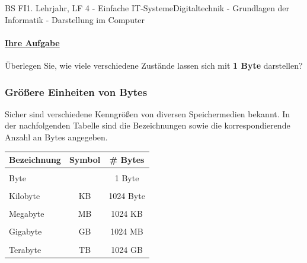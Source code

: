 \documentclass[11pt,twocolumn,oneside,openany,headings=optiontotoc,11pt,numbers=noenddot]{article}
\begin{document}
\begin{worksheet}{BS FI}{1. Lehrjahr, LF 4 - Einfache IT-Systeme}{Digitaltechnik - Grundlagen der Informatik - Darstellung im Computer}
		\paragraph{\underline{Ihre Aufgabe}} Überlegen Sie, wie viele verschiedene Zustände lassen sich mit \textbf{1 Byte} darstellen?\\
		\subsubsection*{Größere Einheiten von Bytes}
		Sicher sind verschiedene Kenngrößen von diversen Speichermedien bekannt. In der nachfolgenden Tabelle sind die Bezeichnungen sowie die korrespondierende Anzahl an Bytes angegeben.\\
		\begin{tabularx}{0.45\textwidth}{l|c|c}
			\textbf{Bezeichnung} & \textbf{Symbol} & \textbf{\# Bytes}\\
			\hline
			& &\\
			Byte & & 1 Byte\\
			\hline
			& &\\
			Kilobyte & KB & 1024 Byte\\
			\hline
			& &\\
			Megabyte & MB & 1024 KB\\
			\hline
			& &\\
			Gigabyte & GB & 1024 MB\\
			\hline
			& &\\
			Terabyte & TB & 1024 GB\\
			\hline
		\end{tabularx}

\end{worksheet}
\end{document}
